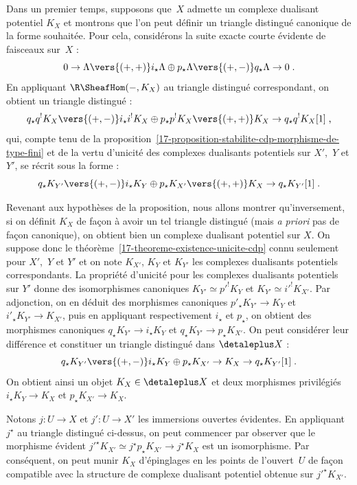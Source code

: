 \documentclass[10pt]{../fichiers-configuration-latex/smfart}
\begin{document}
Dans un premier temps, supposons que $X$ admette un complexe dualisant
potentiel $K_X$ et montrons que l'on peut définir un triangle distingué
canonique de la forme souhaitée. Pour cela, considérons la suite exacte
courte évidente de faisceaux sur $X$ :
\[0\to \Lambda\vers {(+,+)} i_\star\Lambda\oplus p_\star\Lambda\vers{(+,-)}
q_\star\Lambda\to 0\;\text{.}\]
En appliquant $\R\SheafHom(-,K_X)$ au triangle distingué
correspondant, on obtient un triangle distingué :
\[q_\star q^!K_X\vers {(+,-)}
i_\star i^! K_X\oplus p_\star p^!K_X\vers{(+,+)}
K_X\to q_\star q^!K_X[1]\;\text{,}\]
qui, compte tenu de la
proposition~\ref{17-proposition-stabilite-cdp-morphisme-de-type-fini} et de la
vertu d'unicité des complexes dualisants potentiels sur $X'$, $Y$ et $Y'$,
se récrit sous la forme :
\[q_\star K_{Y'}\vers {(+,-)} i_\star K_Y\oplus p_\star K_{X'}\vers{(+,+)}
K_X\to q_\star K_{Y'}[1]\;\text{.}\]

Revenant aux hypothèses de la proposition, nous allons montrer
qu'inversement, si on définit $K_X$ de façon à avoir un tel triangle
distingué (mais \emph{a priori} pas de façon canonique),
on obtient bien un complexe dualisant potentiel sur $X$. On
suppose donc le théorème~\ref{17-theoreme-existence-unicite-cdp} connu
seulement pour $X'$, $Y$ et $Y'$ et on note $K_{X'}$, $K_Y$ et $K_{Y'}$ les
complexes dualisants potentiels correspondants. La propriété d'unicité pour
les complexes dualisants potentiels sur $Y'$ donne des isomorphismes
canoniques $K_{Y'}\simeq {p'}^!K_Y$ et $K_{Y'}\simeq {i'}^!K_{X'}$. Par
adjonction, on en déduit des morphismes canoniques 
$p'_\star K_{Y'}\to K_Y$ et $i'_\star K_{Y'}\to K_{X'}$, puis en appliquant
respectivement $i_\star$ et $p_\star$, on obtient des morphismes canoniques
$q_\star K_{Y'}\to i_\star K_Y$ et $q_\star K_{Y'}\to p_\star
K_{X'}$. On peut considérer leur différence et constituer
un triangle distingué dans $\detaleplus X$ :
\[q_\star K_{Y'}\vers {(+,-)} i_\star K_Y\oplus p_\star K_{X'}\to
K_X\to q_\star K_{Y'}[1]\;\text{.}\]
On obtient ainsi un objet $K_X\in\detaleplus X$ et deux morphismes privilégiés
$i_\star K_Y\to K_X$ et $p_\star K_{X'}\to K_X$.

Notons $j\colon U\to X$ et $j'\colon U\to X'$ les immersions ouvertes
évidentes. En appliquant $j^\star$ au triangle distingué ci-dessus, on peut
commencer par observer que le morphisme évident ${j'}^\star K_{X'}\simeq
j^\star p_\star K_{X'}\to j^\star K_X$ est un isomorphisme. Par conséquent,
on peut munir $K_X$ d'épinglages en les points de l'ouvert $U$ de façon
compatible avec la structure de complexe dualisant potentiel obtenue sur
${j'}^\star K_{X'}$.
\end{document}
